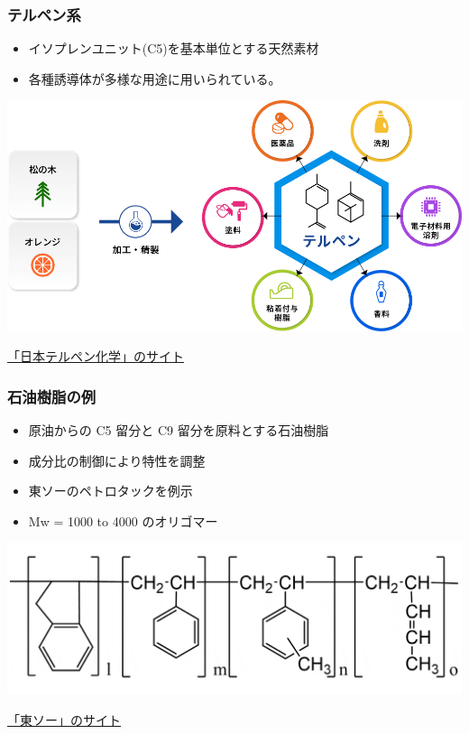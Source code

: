 \documentclass[unicode,12pt]{beamer}%
\begin{document}
\begin{frame}
	\frametitle{テルペン系}
		\begin{itemize}
			\item イソプレンユニット(C5)を基本単位とする天然素材
			\item 各種誘導体が多様な用途に用いられている。
		\end{itemize}
		\centering
			\includegraphics[width=\textwidth]{tackifier_terpene.png}

		\href{https://www.nipponterpene.co.jp/about/}{「日本テルペン化学」のサイト}
\end{frame}

\begin{frame}
	\frametitle{石油樹脂の例}
	\begin{itemize}
		\item 原油からの C5 留分と C9 留分を原料とする石油樹脂
		\item 成分比の制御により特性を調整
		\item 東ソーのペトロタックを例示
		\item Mw = 1000 to 4000 のオリゴマー
	\end{itemize}
	
		\centering
			\includegraphics[width=\textwidth]{tackifier_petroleun_polymer.png}
	
			\href{https://www.tosoh.co.jp/product/polymer/c5_c9_type_petroleun_polymer_resins.html}{「東ソー」のサイト}
\end{frame}
\end{document}
